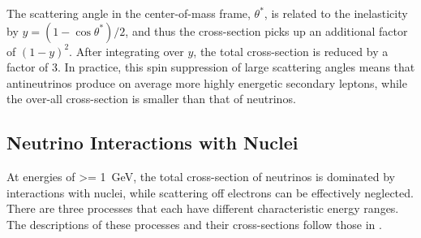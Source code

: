 The scattering angle in the center-of-mass frame, $\theta^*$, is related to the inelasticity by $y=(1-\cos\theta^*)/2$, and thus the cross-section picks up an additional factor of $(1 - y)^2$. After integrating over $y$, the total cross-section is reduced by a factor of 3. In practice, this spin suppression of large scattering angles means that antineutrinos produce on average more highly energetic secondary leptons, while the over-all cross-section is smaller than that of neutrinos.

\subsection{Neutrino Interactions with Nuclei}
\label{sec:neutrino-xsec}

At energies of \SI{>= 1}{\giga\eV}, the total cross-section of neutrinos is dominated by interactions with nuclei, while scattering off electrons can be effectively neglected. There are three processes that each have different characteristic energy ranges. The descriptions of these processes and their cross-sections follow those in .

